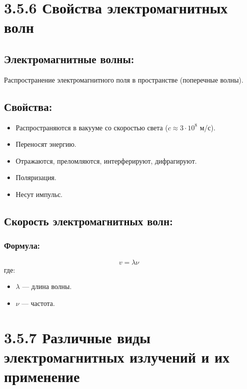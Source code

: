 \documentclass[a4paper,12pt]{article}
\begin{document}
\section*{3.5.6 Свойства электромагнитных волн}
\vspace{-9pt}
\subsection*{Электромагнитные волны:}
\vspace{-3pt}
Распространение электромагнитного поля в пространстве (поперечные волны).

\vspace{-9pt}
\subsection*{Свойства:}
\vspace{-3pt}
\begin{itemize}
    \item Распространяются в вакууме со скоростью света ($c \approx 3 \cdot 10^8$ м/с).
    \item Переносят энергию.
    \item Отражаются, преломляются, интерферируют, дифрагируют.
    \item Поляризация.
    \item Несут импульс.
\end{itemize}

\vspace{-9pt}
\subsection*{Скорость электромагнитных волн:}
\vspace{-3pt}
\subsubsection*{Формула:}
\vspace{-0.05em}
$$ v = \lambda \nu $$
где:
\begin{itemize}
    \item $\lambda$ — длина волны.
    \item $\nu$ — частота.
\end{itemize}

\section*{3.5.7 Различные виды электромагнитных излучений и их применение}
\vspace{-9pt}
\end{document}
